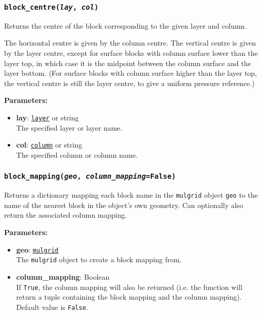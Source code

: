 \begin{snugshade}\subsubsection{\texttt{block\_centre(\emph{lay}, \emph{col})}}\end{snugshade}
\label{sec:mulgrid:block_centre}

Returns the centre of the block corresponding to the given layer and column.

The horizontal centre is given by the column centre. The vertical centre is given by the layer centre, except for surface blocks with column surface lower than the layer top, in which case it is the midpoint between the column surface and the layer bottom.  (For surface blocks with column surface higher than the layer top, the vertical centre is still the layer centre, to give a uniform pressure reference.)

\textbf{Parameters:}
\begin{itemize}
\item \textbf{lay}: \hyperref[layerobjects]{\texttt{layer}} or string\\
  The specified layer or layer name.
\item \textbf{col}: \hyperref[columnobjects]{\texttt{column}} or string\\
  The specified column or column name.
\end{itemize}

\begin{snugshade}\subsubsection{\texttt{block\_mapping(\emph{geo}, \emph{column\_mapping}=\texttt{False})}}\end{snugshade}
\label{sec:mulgrid:block_mapping}

Returns a dictionary mapping each block name in the \texttt{mulgrid} object \texttt{geo} to the name of the nearest block in the object's own geometry.  Can optionally also return the associated column mapping.

\textbf{Parameters:}
\begin{itemize}
\item \textbf{geo}: \hyperref[mulgrids]{\texttt{mulgrid}}\\
  The \texttt{mulgrid} object to create a block mapping from.
\item \textbf{column\_mapping}: Boolean\\
  If \texttt{True}, the column mapping will also be returned (i.e. the function will return a tuple containing the block mapping and the column mapping).  Default value is \texttt{False}.
\end{itemize}

